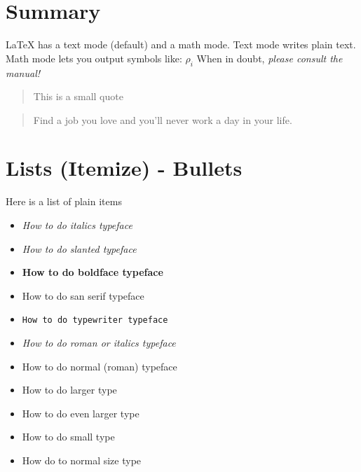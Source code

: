 \documentclass[11pt]{report}  %
\begin{document}
\maketitle  %

\begin{comment}
  This is a
  multi-line comment
  that will be ignored
\end{comment}

\section*{Summary}  %
LaTeX has a text mode (default) and a math mode.
Text mode writes plain text.  Math mode lets you output symbols like: $\rho_i$
When in doubt, \em please \em consult the manual!

\begin{quote}
This is a small quote
\end{quote}

\begin{quotation}
Find a job you love and you'll never work a day in your life.
\end{quotation}

\section*{Lists (Itemize) - Bullets}
Here is a list of plain items
\begin{itemize}  %
\item \it How to do italics typeface
\item \sl How to do slanted typeface
\item \bf How to do boldface typeface
\item \sf How to do san serif typeface
\item {\tt How to do typewriter typeface}  %
\item \em How to do roman or italics typeface
\item \rm How to do normal (roman) typeface  %
\item \large How to do larger type
\item \Large How to do even larger type
\item \small How to do small type
\item \normalsize How do to normal size type
\end{itemize}
\end{document}
